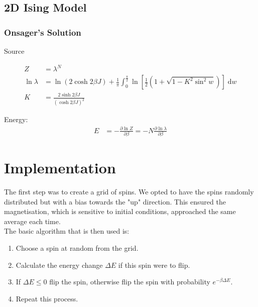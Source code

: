 \documentclass[11pt]{article}
\newcommand{\vd}{\mathrm{d}} %
\begin{document}
	\subsection{2D Ising Model}
	
	\subsubsection*{Onsager's Solution}
	
	Source\cite{onsager_solution}
	
	\begin{equation}
		\begin{split}
			Z &= \lambda^N \\
			\ln{\lambda} &= \ln{\left(2 \cosh{2\beta J}\right)} + \frac{1}{\pi}\int_0^{\frac{\pi}{2}} \ln{\left[\frac{1}{2}\left(1 + \sqrt{1 - K^2\sin^2{w}}\right)\right]\;\vd w} \\
			K &= \frac{2\sinh{2\beta J}}{\left(\cosh{2\beta J}\right)^2}
		\end{split}
	\end{equation}
	
	Energy:
	\begin{equation}
		\begin{split}
			E &= - \frac{\partial \ln{Z}}{\partial \beta} = -N\frac{\partial \ln{\lambda}}{\partial \beta}
		\end{split}
	\end{equation}
	
	\section{Implementation}
	
	The first step was to create a grid of spins. We opted to have the spins randomly distributed but with a bias towards the "up" direction. This ensured the magnetisation, which is sensitive to initial conditions, approached the same average each time.\\
	
	The basic algorithm that is then used is:
	\begin{enumerate}
		\item Choose a spin at random from the grid.
		\item Calculate the energy change $\Delta E$ if this spin were to flip.
		\item If $\Delta E \leq 0$ flip the spin, otherwise flip the spin with probability $e^{-\beta\Delta E}$.
		\item Repeat this process.
	\end{enumerate}
	
\end{document}
